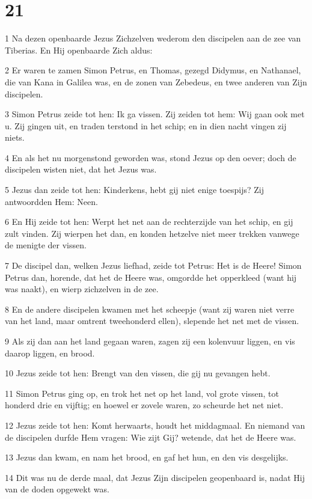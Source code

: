 \chapter{21}

\par 1 Na dezen openbaarde Jezus Zichzelven wederom den discipelen aan de zee van Tiberias. En Hij openbaarde Zich aldus:
\par 2 Er waren te zamen Simon Petrus, en Thomas, gezegd Didymus, en Nathanael, die van Kana in Galilea was, en de zonen van Zebedeus, en twee anderen van Zijn discipelen.
\par 3 Simon Petrus zeide tot hen: Ik ga vissen. Zij zeiden tot hem: Wij gaan ook met u. Zij gingen uit, en traden terstond in het schip; en in dien nacht vingen zij niets.
\par 4 En als het nu morgenstond geworden was, stond Jezus op den oever; doch de discipelen wisten niet, dat het Jezus was.
\par 5 Jezus dan zeide tot hen: Kinderkens, hebt gij niet enige toespijs? Zij antwoordden Hem: Neen.
\par 6 En Hij zeide tot hen: Werpt het net aan de rechterzijde van het schip, en gij zult vinden. Zij wierpen het dan, en konden hetzelve niet meer trekken vanwege de menigte der vissen.
\par 7 De discipel dan, welken Jezus liefhad, zeide tot Petrus: Het is de Heere! Simon Petrus dan, horende, dat het de Heere was, omgordde het opperkleed (want hij was naakt), en wierp zichzelven in de zee.
\par 8 En de andere discipelen kwamen met het scheepje (want zij waren niet verre van het land, maar omtrent tweehonderd ellen), slepende het net met de vissen.
\par 9 Als zij dan aan het land gegaan waren, zagen zij een kolenvuur liggen, en vis daarop liggen, en brood.
\par 10 Jezus zeide tot hen: Brengt van den vissen, die gij nu gevangen hebt.
\par 11 Simon Petrus ging op, en trok het net op het land, vol grote vissen, tot honderd drie en vijftig; en hoewel er zovele waren, zo scheurde het net niet.
\par 12 Jezus zeide tot hen: Komt herwaarts, houdt het middagmaal. En niemand van de discipelen durfde Hem vragen: Wie zijt Gij? wetende, dat het de Heere was.
\par 13 Jezus dan kwam, en nam het brood, en gaf het hun, en den vis desgelijks.
\par 14 Dit was nu de derde maal, dat Jezus Zijn discipelen geopenbaard is, nadat Hij van de doden opgewekt was.
